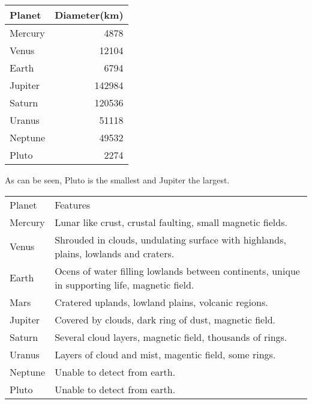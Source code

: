 \documentclass[a4paper, UTF8]{article}
\begin{document}
\begin{center}
    \begin{tabular}{|l|r|}
        \hline
        Planet  &   Diameter(km)\\[5pt]
        \hline        
        Mercury &   4878\\
        \hline
        Venus   &   12104\\
        \hline
        Earth   &   6794\\
        \hline
        Jupiter &   142984\\
        \hline
        Saturn  &   120536\\
        \hline
        Uranus  &   51118\\
        \hline
        Neptune &   49532\\
        \hline
        Pluto   &   2274\\
        \hline
    \end{tabular}
\end{center}

As can be seen, Pluto is the smallest and Jupiter the largest.

\begin{center}
    \begin{tabular}{lp{.8\linewidth}}
        Planet  &   Features\\[8pt]
        Mercury &   Lunar like crust, crustal faulting, small magnetic fields.\\
        Venus   &   Shrouded in clouds, undulating surface with highlands, plains, lowlands and craters.\\
        Earth   &   Ocens of water filling lowlands between continents, unique in supporting life, magnetic field.\\
        Mars    &   Cratered uplands, lowland plains, volcanic regions.\\
        Jupiter &   Covered by clouds, dark ring of dust, magnetic field.\\ 
        Saturn  &   Several cloud layers, magnetic field, thousands of rings.\\
        Uranus  &   Layers of cloud and mist, magentic field, some rings.\\ 
        Neptune &   Unable to detect from earth.\\ 
        Pluto   &   Unable to detect from earth.
    \end{tabular}
\end{center}
\end{document}
